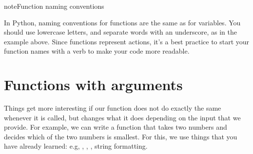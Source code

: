 \documentclass[letterpaper,10pt,english]{jupyterBook}
\begin{document}
\begin{sphinxVerbatim}[commandchars=\\\{\}]
             

         
\end{sphinxVerbatim}

\begin{sphinxadmonition}{note}{Function naming conventions}

\sphinxAtStartPar
In Python, naming conventions for functions are the same as for variables. You should use lowercase letters, and separate words with an underscore, as in the  example above. Since functions represent actions, it’s a best practice to start your function names with a verb to make your code more readable.
\end{sphinxadmonition}


\section{Functions with arguments}
\label{\detokenize{notebooks/04_Functions/04_Functions_student:functions-with-arguments}}
\sphinxAtStartPar
Things get more interesting if our function does not do exactly the same whenever it is called, but changes what it does depending on the input that we provide. For example, we can write a function that takes two numbers and decides which of the two numbers is smallest. For this, we use things that you have already learned: e.g, , , , string formatting.
\end{document}
